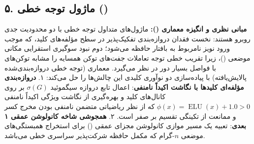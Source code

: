 \subsection*{۵. ماژول توجه خطی  ()}

\textbf{مبانی نظری و انگیزه معماری ():}
ماژول‌های متداول توجه خطی با دو محدودیت جدی روبرو هستند: نخست فقدان دروازه‌بندی تفکیک‌پذیر در سطح مؤلفه‌های کلید، که موجب ورود نویز نامربوط به بافتار حافظه می‌شود؛ دوم نبود سوگیری استقرایی مکانی موضعی ()، زیرا تقریب خطی توجه تعاملات جفت‌های توکن همسایه را مشابه توکن‌های با فواصل بسیار دور در نظر می‌گیرد.
معماری  (توجه خطی دروازه‌بندی‌شده پالایش‌یافته) با پیاده‌سازی دو نوآوری کلیدی این چالش‌ها را حل می‌کند:
۱. \textbf{دروازه‌بندی مؤلفه‌ای کلیدها با نگاشت اکیداً نامنفی}: اعمال تابع دروازه سیگموئید $\sigma(G)$ بر روی کانال‌های کلید و بهره‌گیری از نگاشت ویژگی اکیداً نامنفی $\phi(x) = \operatorname{ELU}(x) + 1.0 > 0$ که از نظر ریاضیاتی متضمن نامنفی بودن مخرج کسر و ممانعت از تکینگی تقسیم بر صفر است.
۲. \textbf{همجوشی شاخه کانولوشن عمقی ۱ بعدی}: تعبیه یک مسیر موازی کانولوشن مجزای عمقی () برای استخراج همبستگی‌های موضعی $n$-گرام که مکمل حافظه شرکت‌پذیر سراسری خطی می‌باشد.

